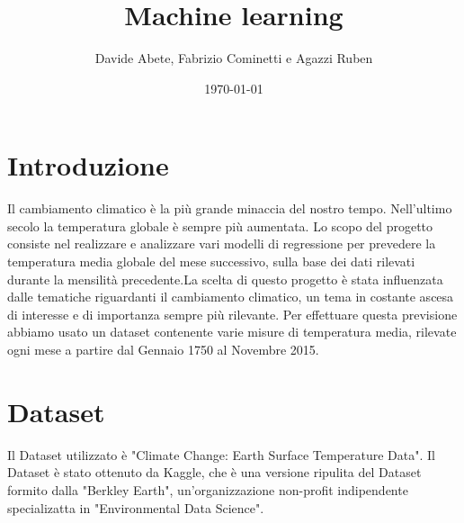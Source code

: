 \documentclass[10pt, a4paper, twocolumn]{article} %
\title{Machine learning} %
\author{
	Davide Abete, Fabrizio Cominetti e Agazzi Ruben %
}
\date{\today} %
\begin{document}
\maketitle %

\thispagestyle{firstpage} %

\tableofcontents
{}



\section{Introduzione}
Il cambiamento climatico è la più grande minaccia del nostro tempo.
Nell'ultimo secolo la temperatura globale è sempre più aumentata.%
Lo scopo del progetto consiste nel realizzare e analizzare vari modelli di regressione per prevedere la temperatura media globale del mese successivo, sulla base dei dati rilevati durante la mensilità precedente.La scelta di questo progetto è stata influenzata dalle tematiche riguardanti il cambiamento climatico, un tema in costante ascesa di interesse e di importanza sempre più rilevante.
Per effettuare questa previsione abbiamo usato un dataset contenente varie misure di temperatura media, rilevate ogni mese a partire dal Gennaio 1750 al Novembre 2015.



\section{Dataset}

Il Dataset utilizzato è "Climate Change: Earth Surface Temperature Data".%
Il Dataset è stato ottenuto da Kaggle, che è una versione ripulita del Dataset formito dalla "Berkley Earth", un'organizzazione non-profit indipendente specializatta in "Environmental Data Science".
\end{document}
